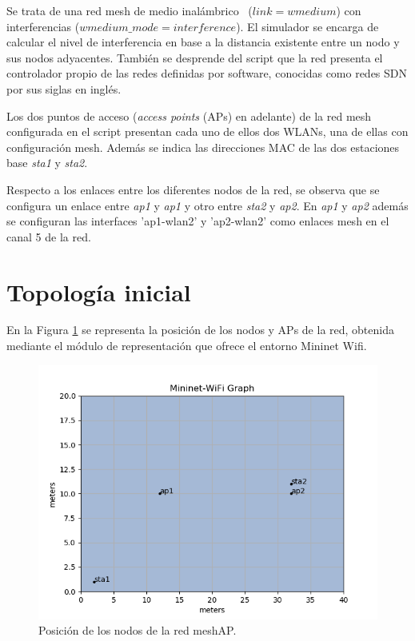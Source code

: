 \documentclass[a4paper,12pt,twoside,spanish]{book}
\begin{document}
Se trata de una red mesh de medio inalámbrico \
($link=wmedium$) con interferencias ($wmedium\_mode=interference$). El simulador se encarga de calcular el nivel de interferencia en base a la distancia existente entre un nodo y sus nodos adyacentes. También se desprende del script que la red presenta el controlador propio de las redes definidas por software, conocidas como redes SDN por sus siglas en inglés.\par

Los dos puntos de acceso (\textit{access points} (APs) en adelante) de la red mesh configurada en el script presentan cada uno de ellos dos WLANs, una de ellas con configuración mesh. Además se indica las direcciones MAC de las dos estaciones base \textit{sta1} y \textit{sta2}.\par

Respecto a los enlaces entre los diferentes nodos de la red, se observa que se configura un enlace entre \textit{ap1} y \textit{ap1} y otro entre \textit{sta2} y \textit{ap2}. En \textit{ap1} y \textit{ap2} además se configuran las interfaces 'ap1-wlan2' y 'ap2-wlan2' como enlaces mesh en el canal 5 de la red.\par








\section{Topología inicial}\label{sect:topo_inicial}

En la Figura \ref{fig:pos} se representa la posición de los nodos y APs de la red, obtenida mediante el módulo de representación que ofrece el entorno Mininet Wifi.

	\begin{figure}[!h]
		\centering
		\includegraphics[scale=0.7]{Figuras/posicion.png}
		\caption{Posición de los nodos de la red meshAP.}
		\label{fig:pos}
	\end{figure}
\end{document}
